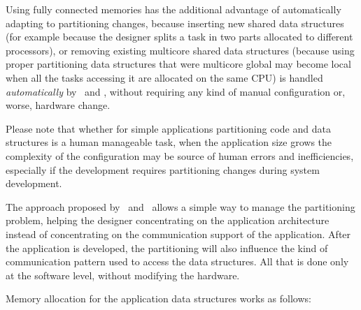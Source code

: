 Using fully connected memories has the additional advantage of
automatically adapting to partitioning changes, because inserting new
shared data structures (for example because the designer splits a task
in two parts allocated to different processors), or removing existing
multicore shared data structures (because using proper
partitioning data structures that were multicore global may
become local when all the tasks accessing it are allocated on the same
CPU) is handled {\em automatically} by \rtd\ and \ee,
without requiring any kind of manual configuration or, worse, hardware
change.

Please note that whether for simple applications partitioning code and
data structures is a human manageable task, when the application size
grows the complexity of the configuration may be source of human errors
and inefficiencies, especially if the development requires
partitioning changes during system development.

The approach proposed by \rtd\ and \ee\ allows a simple way to
manage the partitioning problem, helping the designer concentrating on
the application architecture instead of concentrating on the
communication support of the application. After the application is
developed, the partitioning will also influence the kind of
communication pattern used to access the data structures. All that is
done only at the software level, without modifying the hardware.

Memory allocation for the application data structures works as follows:

